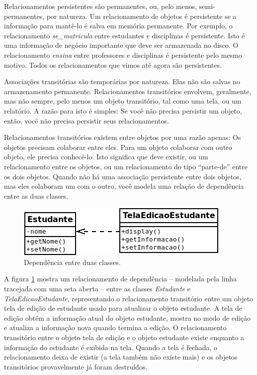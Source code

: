 Relacionamentos persistentes são permanentes, ou, pelo menos, semi-permanentes, por natureza. Um relacionamento de objetos é persistente se a informação para mantê-lo é salva em memória permanente. Por exemplo, o relacionamento \emph{se\_matricula} entre estudantes e disciplinas é persistente. Isto é uma informação de negócio importante que deve ser armazenada no disco. O relacionamento \emph{ensina} entre professores e disciplinas é persistente pelo mesmo motivo. Todos os relacionamentos que vimos até agora são persistentes.

Associações transitórias são temporárias por natureza. Elas não são salvas no armazenamento permanente. Relacionamentos transitórios envolvem, geralmente, mas não sempre, pelo menos um objeto transitório, tal como uma tela, ou um relatório. A razão para isto é simples: Se você não precisa persistir um objeto, então, você não precisa persistir seus relacionamentos.

Relacionamentos transitórios existem entre objetos por uma razão apenas: Os objetos precisam colaborar entre eles. Para um objeto colaborar com outro objeto, ele precisa conhecê-lo. Isto significa que deve existir, ou um relacionamento entre os objetos, ou um relacionamento do tipo ``parte-de'' entre os dois objetos. Quando não há uma associação persistente  entre dois objetos, mas eles colaboram um com o outro, você modela uma relação de dependência entre as duas classes.

\begin{figure}[h]
\begin{center}
\includegraphics[scale=0.7]{classDep.png}
\end{center}
\caption{Dependência entre duas classes.} \label{fig:clsDep}
\end{figure}

A figura \ref{fig:clsDep} mostra um relacionamento de dependência -- modelada pela linha tracejada com uma seta aberta -- entre as classes \emph{Estudante} e \emph{TelaEdicaoEstudante}, representando o relacionamento transitório entre um objeto tela de edição de estudante usado para atualizar o objeto estudante. A tela de edição obtém a informação atual do objeto estudante, mostra no modo de edição e atualiza a informação nova quando termina a edição. O relacionamento transitório entre o objeto tela de edição e o objeto estudante existe enquanto a informação do estudante é exibida na tela. Quando a tela é fechada, o relacionamento deixa de existir (a tela também não existe mais) e os objetos transitórios provavelmente já foram destruídos.

